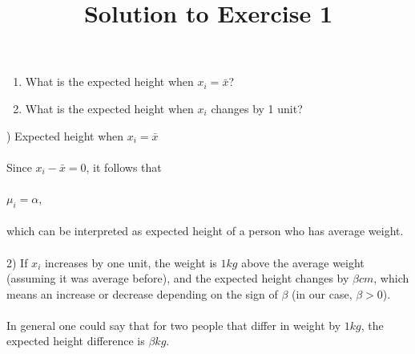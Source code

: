 \documentclass{article}
\title{Solution to Exercise 1}
\author{}
\date{}
\begin{document}
\begin{enumerate}
    \item What is the expected height when  $x_i = \bar{x}$?
    \item What is the expected height when $ x_i $ changes by 1 unit?
\end{enumerate}
\vspace{1cm}
) Expected height when \( x_i = \bar{x} \)\\
\\
Since $x_i - \bar{x} = 0$, it follows that\\
\\
$\mu_i = \alpha$,\\
\\
which can be interpreted as expected height of a person who has average weight.\\
\\
2) If $x_i$ increases by one unit, the weight is $1kg$ above the average weight (assuming it was average before),
and the expected height changes by $\beta cm$, which means an increase or decrease
depending on the sign of $\beta$ (in our case, $\beta >0$).\\
\\
In general one could say that for two people that differ in weight by $1kg$, the expected
height difference is $\beta kg$.
\end{document}
